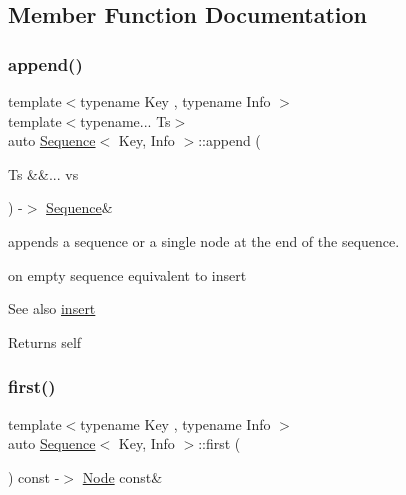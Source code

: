 \subsection{Member Function Documentation}
\mbox{\label{structSequence_a64bd7f922b3cbf1dbb231f322ea4550b}} 
\subsubsection{\texorpdfstring{append()}{append()}}
{\footnotesize\ttfamily template$<$typename Key , typename Info $>$ \\
template$<$typename... Ts$>$ \\
auto \mbox{\hyperlink{structSequence}{Sequence}}$<$ Key, Info $>$\+::append (\begin{DoxyParamCaption}\item[{Ts \&\&...}]{vs }\end{DoxyParamCaption}) -\/$>$ \mbox{\hyperlink{structSequence}{Sequence}}\& \hspace{0.3cm}{\ttfamily [inline]}}



appends a sequence or a single node at the end of the sequence. 

on empty sequence equivalent to insert \begin{DoxySeeAlso}{See also}
\mbox{\hyperlink{structSequence_ad11535a8ff826be81bcb3e80081d4651}{insert}} 
\end{DoxySeeAlso}
\begin{DoxyReturn}{Returns}
self 
\end{DoxyReturn}
\mbox{\label{structSequence_a4cf528c57999936c6ca10d838d709787}} 
\subsubsection{\texorpdfstring{first()}{first()}\hspace{0.1cm}{\footnotesize\ttfamily [1/2]}}
{\footnotesize\ttfamily template$<$typename Key , typename Info $>$ \\
auto \mbox{\hyperlink{structSequence}{Sequence}}$<$ Key, Info $>$\+::first (\begin{DoxyParamCaption}{ }\end{DoxyParamCaption}) const -\/$>$ \mbox{\hyperlink{structSequence_1_1Node}{Node}} const\& \hspace{0.3cm}{\ttfamily [inline]}}



